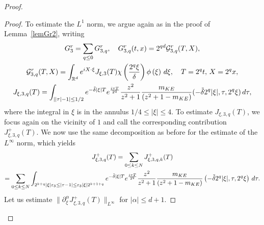\documentclass[11pt]{amsart}
\numberwithin{equation}{section}
\newcommand{\eps}{\varepsilon}
\begin{document}
\begin{proof}
\begin{proof}
   To estimate the $L^1$ norm, we argue again as in the proof of Lemma~\ref{lemGr2}, 
writing
      \begin{multline}
   \label{G1rLP-3} G_{3}^r = \sum_{q \leq 0} G^r_{3,q}, \quad
 G^r_{3, q}(t,x) = 2^{qd} \mathcal{G}^r_{3,q} (T, X), \\
  \mathcal{G}^r_{3,q} (T, X)
  = \int_{\mathbb{R}^d}  e^{i X \cdot \xi} J_{\xi, 3} (T)   \chi \left( { 2^q  \xi \over \delta} \right)   \phi \left(  \xi \right)\, d \xi, 
  \quad  T= 2^qt, \, X= 2^q x,\\
   J_{\xi, 3, q}(T)=
    \int_{ || \tau |- 1 |  \leq 1/2 }e^{-  \tilde \delta |\xi| T}  e^{i \tau T \over 2^q}  {z^2 \over z^2+1}   { m_{KE} \over (z^2+ 1 - m_{KE})}(
    - \tilde \delta 2^q | \xi |,  \tau,  
    2^q  \xi )\, d\tau,
    \end{multline} 
    where  the integral in $\xi$ is in  the annulus $ 1/4 \leq | \xi | \leq 4.$  
     To estimate  $J_{\xi, 3, q}(T)$, we focus again on the vicinity of $1$ and call the corresponding contribution
$J_{\xi, 3, q}^+(T)$. We now use the same decomposition as before for the estimate of the $L^\infty$ norm, which yields 
\begin{multline*}
 J_{\xi, 3, q}^+(T) = \sum_{0 \leq k \leq N} J_{\xi, 3, q, k}^+(T)  \\=  \sum_{0 \leq k \leq N} \int_{ 2^{k+q} |\xi| \eps_{3} \leq  |\tau - 1 | \leq \eps_{3} |\xi| 2^{k + 1+q}} 
      e^{-  \tilde \delta |\xi| T}  e^{i \tau T \over 2^q}  {z^2 \over z^2+1}   { m_{KE} \over (z^2+ 1 - m_{KE})}\left(
    - \tilde \delta 2^q | \xi |,  \tau,  
    2^q  \xi \right)\, d\tau.
    \end{multline*}
    Let us estimate
  $  \|\partial^\alpha_{\xi} J_{\xi, 3, q}^+(T)\|_{L^\infty}$ for $| \alpha | \leq d+1.$
  

\end{proof}
\end{proof}
\end{document}
